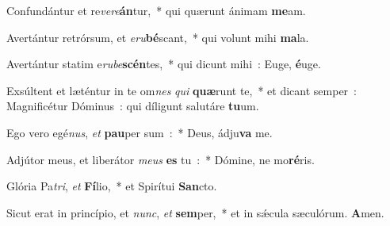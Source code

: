 \item Confundántur et re\emph{ve}\emph{re}\textbf{án}tur,~* qui quærunt ánimam \textbf{me}am.
\item Avertántur retrórsum, et \emph{e}\emph{ru}\-\textbf{bé}\-scant,~* qui volunt mihi \textbf{ma}la.
\item Avertántur statim e\emph{ru}\-\emph{be}\-\textbf{scén}\-tes,~* qui dicunt mihi~: Euge, \textbf{é}uge.
\item Exsúltent et læténtur in te om\emph{nes} \emph{qui} \textbf{quæ}runt te,~* et dicant semper~: Magnificétur Dóminus~: qui díligunt salutáre \textbf{tu}um.
\item Ego vero egé\emph{nus}, \emph{et} \textbf{pau}per sum~:~* Deus, ádju\textbf{va} me.
\item Adjútor meus, et liberátor \emph{me}\emph{us} \textbf{es} tu~:~* Dómine, ne mo\textbf{ré}ris.
\item Glória Pa\emph{tri}, \emph{et} \textbf{Fí}lio,~* et Spirítui \textbf{San}cto.
\item Sicut erat in princípio, et \emph{nunc}, \emph{et} \textbf{sem}per,~* et in sǽcula sæculórum. \textbf{A}men.